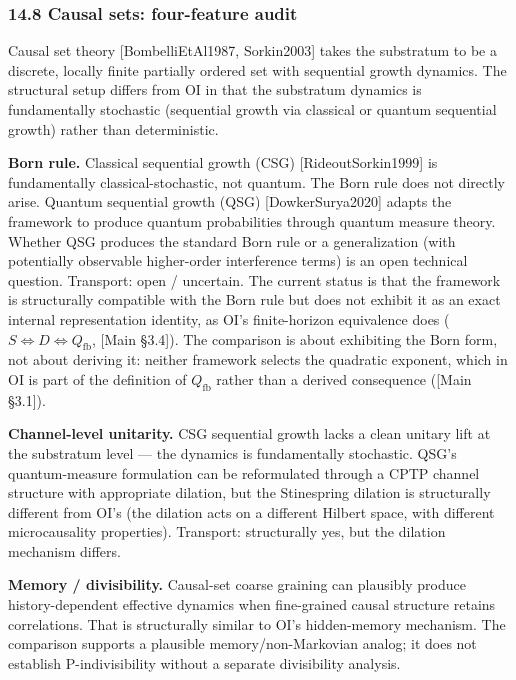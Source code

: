 \documentclass[
]{article}
\begin{document}
\hypertarget{causal-sets-four-feature-audit}{%
\subsubsection{14.8 Causal sets: four-feature
audit}\label{causal-sets-four-feature-audit}}

Causal set theory {[}BombelliEtAl1987, Sorkin2003{]} takes the
substratum to be a discrete, locally finite partially ordered set with
sequential growth dynamics. The structural setup differs from OI in that
the substratum dynamics is fundamentally stochastic (sequential growth
via classical or quantum sequential growth) rather than deterministic.

\textbf{Born rule.} Classical sequential growth (CSG)
{[}RideoutSorkin1999{]} is fundamentally classical-stochastic, not
quantum. The Born rule does not directly arise. Quantum sequential
growth (QSG) {[}DowkerSurya2020{]} adapts the framework to produce
quantum probabilities through quantum measure theory. Whether QSG
produces the standard Born rule or a generalization (with potentially
observable higher-order interference terms) is an open technical
question. Transport: open / uncertain. The current status is that the
framework is structurally compatible with the Born rule but does not
exhibit it as an exact internal representation identity, as OI's
finite-horizon equivalence does (\(S\iff D\iff Q_{\mathrm{fb}}\),
{[}Main §3.4{]}). The comparison is about exhibiting the Born form, not
about deriving it: neither framework selects the quadratic exponent,
which in OI is part of the definition of \(Q_{\mathrm{fb}}\) rather than
a derived consequence ({[}Main §3.1{]}).

\textbf{Channel-level unitarity.} CSG sequential growth lacks a clean
unitary lift at the substratum level --- the dynamics is fundamentally
stochastic. QSG's quantum-measure formulation can be reformulated
through a CPTP channel structure with appropriate dilation, but the
Stinespring dilation is structurally different from OI's (the dilation
acts on a different Hilbert space, with different microcausality
properties). Transport: structurally yes, but the dilation mechanism
differs.

\textbf{Memory / divisibility.} Causal-set coarse graining can plausibly
produce history-dependent effective dynamics when fine-grained causal
structure retains correlations. That is structurally similar to OI's
hidden-memory mechanism. The comparison supports a plausible
memory/non-Markovian analog; it does not establish P-indivisibility
without a separate divisibility analysis.
\end{document}
